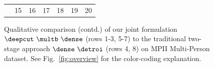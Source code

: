 \begin{figure}
\begin{tabular}{c c c c c c c}
    &15&16&17&18&19&20\\  
  \end{tabular}
  \caption{Qualitative comparison (contd.) of our joint formulation
    $\deepcut~\multb~\dense$ (rows 1-3, 5-7) to the traditional
    two-stage approach $\dense~\detroi$ (rows 4, 8) on MPII
    Multi-Person dataset. 
    See Fig.~\ref{fig:overview} for the color-coding explanation.
    }
  \label{fig:qualitative_mpii2}
\end{figure}
